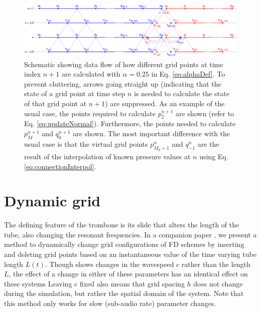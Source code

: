 \begin{figure}[t]
    \centering
    \includegraphics[width = \textwidth]{Figures/tromboneSchematic.eps}
    \caption{Schematic showing data flow of how different grid points at time index $n+1$ are calculated with $\alpha = 0.25$ in Eq. \eqref{eq:alphaDef}. To prevent cluttering, arrows going straight up (indicating that the state of a grid point at time step $n$ is needed to calculate the state of that grid point at $n+1$) are suppressed. As an example of the usual case, the points required to calculate $p_2^{n+1}$ are shown (refer to Eq. \eqref{eq:updateNormal}). Furthermore, the points needed to calculate $p_{M}^{n+1}$ and $q_0^{n+1}$ are shown. The most important difference with the usual case is that the virtual grid points $p_{M_p+1}^n$ and $q_{-1}^n$ 
    are the result of the interpolation of known pressure values at $n$ using Eq. \eqref{eq:connectionInterpol}. %
    \label{fig:dynamicGridSchematic}}
\end{figure}

\section{Dynamic grid}\label{sec:dynamicGrid}
The defining feature of the trombone is its slide that alters the length of the tube, also changing the resonant frequencies. In a companion paper \cite{Willemsen2021}, we present a method to dynamically change grid configurations of FD schemes by inserting and deleting grid points based on an instantaneous value of the time varying tube length $L(t)$.  Though \cite{Willemsen2021} shows changes in the wavespeed $c$ rather than the length $L$, the effect of a change in either of these parameters has an identical effect on these systems  Leaving $c$ fixed also means that grid spacing $h$ does not change during the simulation, but rather the spatial domain of the system. Note that this method only works for slow (sub-audio rate) parameter changes. 

